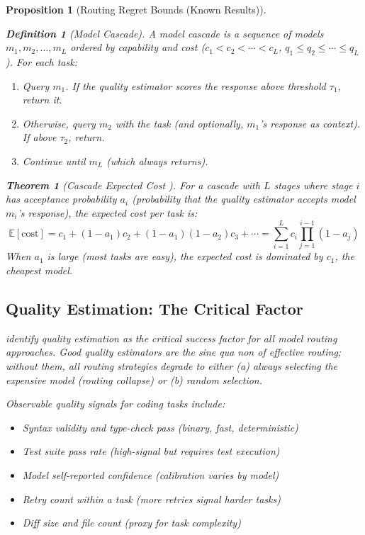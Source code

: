 \documentclass[11pt, a4paper, logo, copyright]{googledeepmind}
\newtheorem{definition}{Definition}[section]
\newtheorem{theorem}{Theorem}[section]
\newtheorem{proposition}{Proposition}[section]
\begin{document}
\begin{proposition}[Routing Regret Bounds (Known Results)]
\begin{definition}[Model Cascade]
A \emph{model cascade} is a sequence of models $m_1, m_2, \ldots, m_L$ ordered by capability and cost ($c_1 < c_2 < \cdots < c_L$, $q_1 \leq q_2 \leq \cdots \leq q_L$). For each task:
\begin{enumerate}
\item Query $m_1$. If the quality estimator scores the response above threshold $\tau_1$, return it.
\item Otherwise, query $m_2$ with the task (and optionally, $m_1$'s response as context). If above $\tau_2$, return.
\item Continue until $m_L$ (which always returns).
\end{enumerate}
\end{definition}

\begin{theorem}[Cascade Expected Cost {\citep{violajones2004}}]
\label{thm:cascadecost}
For a cascade with $L$ stages where stage $i$ has acceptance probability $a_i$ (probability that the quality estimator accepts model $m_i$'s response), the expected cost per task is:
\begin{equation}
\mathbb{E}[\text{cost}] = c_1 + (1 - a_1) c_2 + (1 - a_1)(1 - a_2) c_3 + \cdots = \sum_{i=1}^{L} c_i \prod_{j=1}^{i-1}(1 - a_j)
\end{equation}
When $a_1$ is large (most tasks are easy), the expected cost is dominated by $c_1$, the cheapest model.
\end{theorem}

\subsection{Quality Estimation: The Critical Factor}

\citet{dekoninck2025cascade} identify quality estimation as the critical success factor for all model routing approaches. Good quality estimators are the sine qua non of effective routing; without them, all routing strategies degrade to either (a) always selecting the expensive model (routing collapse) or (b) random selection.

Observable quality signals for coding tasks include:
\begin{itemize}
\item Syntax validity and type-check pass (binary, fast, deterministic)
\item Test suite pass rate (high-signal but requires test execution)
\item Model self-reported confidence (calibration varies by model)
\item Retry count within a task (more retries signal harder tasks)
\item Diff size and file count (proxy for task complexity)
\end{itemize}


\end{proposition}
\end{document}
